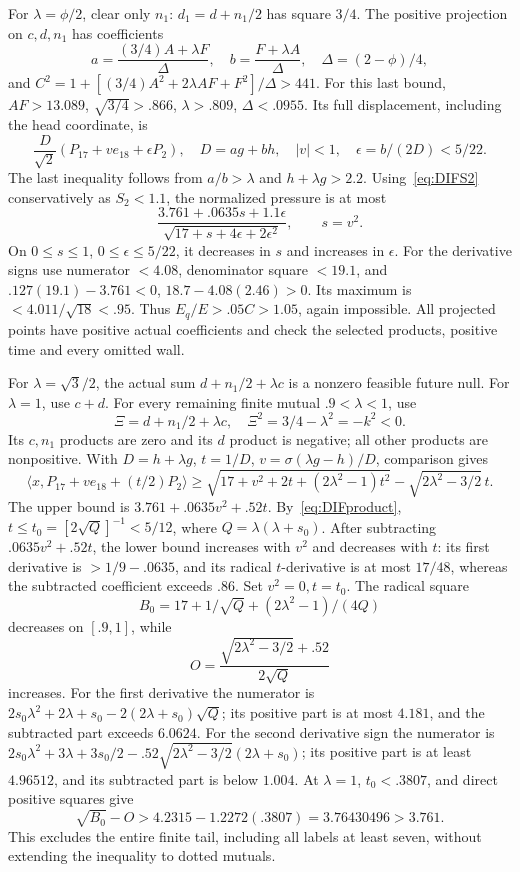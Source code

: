 \documentclass[11pt]{article}
\theoremstyle{definition}
\theoremstyle{remark}
\newcommand{\ip}[2]{\langle #1,#2\rangle}
\begin{document}
For \(\lambda=\phi/2\), clear only \(n_1\):
\(d_1=d+n_1/2\) has square \(3/4\).
The positive projection on \(c,d,n_1\) has coefficients
\[
 a={\frac{(3/4)A+\lambda F}{\Delta}},\quad
 b={\frac{F+\lambda A}{\Delta}},\quad
 \Delta=(2-\phi)/4,
\]
and
\(C^2=1+[(3/4)A^2+2\lambda AF+F^2]/\Delta>441\).
For this last bound, \(AF>13.089\),
\(\sqrt{3/4}>.866\), \(\lambda>.809\), \(\Delta<.0955\).
Its full displacement, including the head coordinate, is
\[
 {\frac{D}{\sqrt2}}
   (P_{17}+ve_{18}+\epsilon P_2),\quad
 D=ag+bh,\quad |v|<1,\quad \epsilon=b/(2D)<5/22.
\]
The last inequality follows from \(a/b>\lambda\) and
\(h+\lambda g>2.2\).
Using~\eqref{eq:DIFS2} conservatively as \(S_2<1.1\),
the normalized pressure is at most
\[
 {\frac{3.761+.0635s+1.1\epsilon
       }{\sqrt{17+s+4\epsilon+2\epsilon^2}}},\qquad s=v^2.
\]
On \(0\le s\le1\), \(0\le\epsilon\le5/22\), it decreases
in \(s\) and increases in \(\epsilon\).
For the derivative signs use numerator \(<4.08\),
denominator square \(<19.1\), and
\(.127(19.1)-3.761<0\),
\(18.7-4.08(2.46)>0\).
Its maximum is \(<4.011/\sqrt{18}<.95\).
Thus \(E_q/E>.05C>1.05\), again impossible.
All projected points have positive actual coefficients and check
the selected products, positive time and every omitted wall.

For \(\lambda=\sqrt3/2\), the actual sum
\(d+n_1/2+\lambda c\) is a nonzero feasible future null.
For \(\lambda=1\), use \(c+d\).
For every remaining finite mutual \(.9<\lambda<1\), use
\[
 \Xi=d+n_1/2+\lambda c,\quad
 \Xi^2=3/4-\lambda^2=-k^2<0 .
\]
Its \(c,n_1\) products are zero and its \(d\) product is negative;
all other products are nonpositive.
With \(D=h+\lambda g\), \(t=1/D\),
\(v=\sigma(\lambda g-h)/D\), comparison gives
\[
 \ip x{P_{17}+ve_{18}+(t/2)P_2}
 \ge\sqrt{17+v^2+2t+(2\lambda^2-1)t^2}
                         -\sqrt{2\lambda^2-3/2}\,t .
\]
The upper bound is
\(3.761+.0635v^2+.52t\).
By~\eqref{eq:DIFproduct},
\(t\le t_0=[2\sqrt{Q}]^{-1}<5/12\), where
\(Q=\lambda(\lambda+s_0)\).
After subtracting \(.0635v^2+.52t\), the lower bound increases
with \(v^2\) and decreases with \(t\):
its first derivative is \(>1/9-.0635\), and its radical
\(t\)-derivative is at most \(17/48\), whereas the subtracted
coefficient exceeds \(.86\).
Set \(v^2=0,t=t_0\).
The radical square
\[
 B_0=17+1/\sqrt Q+(2\lambda^2-1)/(4Q)
\]
decreases on \([.9,1]\), while
\[
 O={\frac{\sqrt{2\lambda^2-3/2}+.52}{2\sqrt Q}}
\]
increases.
For the first derivative the numerator is
\(2s_0\lambda^2+2\lambda+s_0
 -2(2\lambda+s_0)\sqrt Q\);
its positive part is at most \(4.181\), and the subtracted
part exceeds \(6.0624\).
For the second derivative sign the numerator is
\(2s_0\lambda^2+3\lambda+3s_0/2
 -.52\sqrt{2\lambda^2-3/2}(2\lambda+s_0)\);
its positive part is at least \(4.96512\), and its subtracted
part is below \(1.004\).
At \(\lambda=1\), \(t_0<.3807\), and direct positive squares give
\[
 \sqrt{B_0}-O>
 4.2315-1.2272(.3807)=3.76430496>3.761 .
\]
This excludes the entire finite tail, including all labels at least
seven, without extending the inequality to dotted mutuals.
\end{document}
